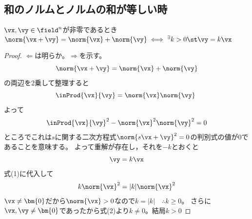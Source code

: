         \subsection{和のノルムとノルムの和が等しい時}
            \begin{shadebox}
                $\vx,\vy\in\field^n$が非零であるとき$\norm{\vx+\vy}=\norm{\vx}+\norm{\vy} \iff ^\exists k>0 \st \vy=k\vx$
            \end{shadebox}
            \begin{proof}
                $\Leftarrow$は明らか。$\Rightarrow$を示す。
                \[\norm{\vx+\vy}=\norm{\vx}+\norm{\vy}\]
                の両辺を2乗して整理すると
                \begin{equation}
                    \inProd{\vx}{\vy} = \norm{\vx}\norm{\vy}\
                \end{equation}
                よって
                \[\inProd{\vx}{\vy}^2-\norm{\vx}^2\norm{\vy}^2=0\]
                ところでこれは$s$に関する二次方程式$\norm{s\vx+\vy}^2=0$の判別式の値が$0$であることを意味する。
                よって重解が存在し，それを$-k$とおくと
                \begin{equation}
                    \vy = k\vx
                \end{equation}
                式(1)に代入して
                \[k\norm{\vx}^2 = |k|\norm{\vx}^2\]
                $\vx\neq\bm{0}$だから$\norm{\vx}>0$なので$k=|k|\quad\therefore k\geq0$。
                さらに$\vx,\vy\neq\bm{0}$であったから式(2)より$k\neq0$。結局$k>0$
            \end{proof}
